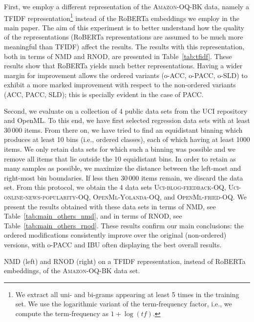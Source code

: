 \documentclass[10pt,a4paper]{article}
\begin{document}
First, we employ a different representation of the
\textsc{Amazon-OQ-BK} data, namely a TFIDF representation\footnote{We extract all uni- and bi-grams appearing at least 5 times in the training set. We use the logarithmic variant of the term-frequency factor, i.e., we compute the term-frequency as $1 + \log(tf)$.}
instead of
the RoBERTa embeddings we employ in the main paper. The aim of this experiment is to better understand how the quality of the representations (RoBERTa representations are assumed to be much more meaningful than TFIDF) affect the results. The results with
this representation, both in terms of NMD and RNOD, are presented in
Table~\ref{tab:tfidf}.
These results show that RoBERTa yields much better representations. Having a wider margin for improvement allows the ordered variants (o-ACC, o-PACC, o-SLD) to exhibit a more marked improvement with respect to the non-ordered variants (ACC, PACC, SLD); this is specially evident in the case of PACC.

Second, we evaluate on a collection of 4 public data sets from the UCI
repository and OpenML. To this end, we have first selected regression
data sets with at least 30\,000 items. From there on, we have tried to
find an equidistant binning which produces at least 10 bins (i.e., ordered
classes), each of which having at least 1000 items. We only retain
data sets for which such a binning was possible and we remove all
items that lie outside the 10 equidistant bins. In order to retain
as many samples as possible, we maximize the distance between the
left-most and right-most bin boundaries. If less then 30\,000 items
remain, we discard the data set. From this protocol, we obtain the 4 data
sets \textsc{Uci-blog-feedback-OQ},
\textsc{Uci-online-news-popularity-OQ}, \textsc{OpenMl-Yolanda-OQ},
and \textsc{OpenMl-fried-OQ}. We present the results obtained with
these data sets in terms of NMD, see Table~\ref{tab:main_others_nmd},
and in terms of RNOD, see Table~\ref{tab:main_others_rnod}.
These results confirm our main conclusions: the ordered modifications consistently improve over the original (non-ordered) versions, with o-PACC and IBU often displaying the best overall results.

\begin{table}
 \centering
 \caption{NMD (left) and RNOD (right) on a TFIDF representation,
 instead of RoBERTa embeddings, of the \textsc{Amazon-OQ-BK} data
 set.}
 \label{tab:tfidf}
 \scriptsize
 \begin{minipage}{.49\textwidth}
 
 \end{minipage}%
 \begin{minipage}{.49\textwidth}
 
 \end{minipage}
\end{table}
\end{document}
